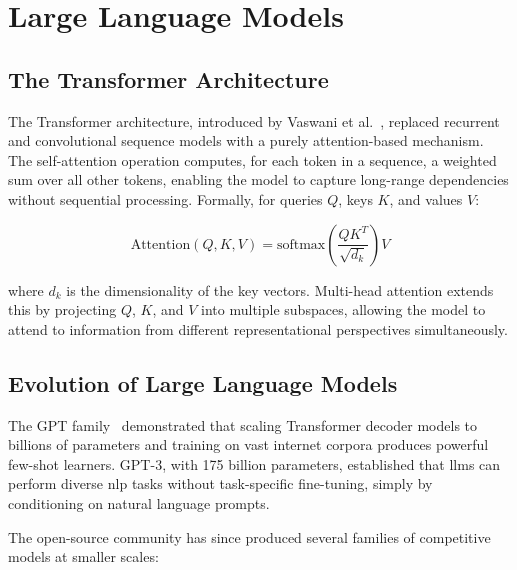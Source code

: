 \documentclass[12pt,a4paper,oneside]{report}
\begin{document}
\section{Large Language Models}
\label{sec:sota-llms}

\subsection{The Transformer Architecture}

The Transformer architecture, introduced by Vaswani et al.~\cite{vaswani2017attention}, replaced recurrent and convolutional sequence models with a purely attention-based mechanism. The self-attention operation computes, for each token in a sequence, a weighted sum over all other tokens, enabling the model to capture long-range dependencies without sequential processing. Formally, for queries $Q$, keys $K$, and values $V$:

\begin{equation}
\text{Attention}(Q, K, V) = \text{softmax}\!\left(\frac{QK^T}{\sqrt{d_k}}\right) V
\label{eq:attention}
\end{equation}

\noindent where $d_k$ is the dimensionality of the key vectors. Multi-head attention extends this by projecting $Q$, $K$, and $V$ into multiple subspaces, allowing the model to attend to information from different representational perspectives simultaneously.

\subsection{Evolution of Large Language Models}

The GPT family~\cite{brown2020language} demonstrated that scaling Transformer decoder models to billions of parameters and training on vast internet corpora produces powerful few-shot learners. GPT-3, with 175 billion parameters, established that \glspl{llm} can perform diverse \gls{nlp} tasks without task-specific fine-tuning, simply by conditioning on natural language prompts.

The open-source community has since produced several families of competitive models at smaller scales:
\end{document}
